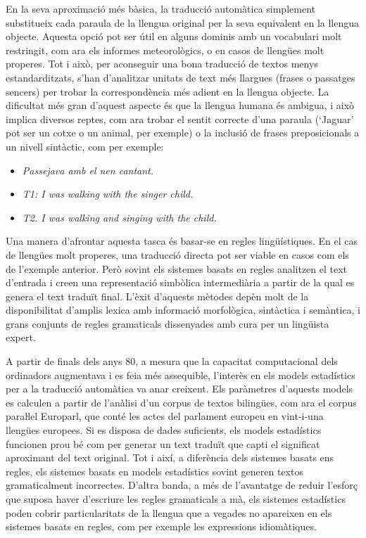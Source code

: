 \begin{multicols}{2}
En la seva aproximació més bàsica, la traducció automàtica simplement substitueix cada paraula de la llengua original per la seva equivalent en la llengua objecte. Aquesta opció pot ser útil en alguns dominis amb un vocabulari molt restringit, com ara els informes meteorològics, o en casos de llengües molt properes. Tot i això, per aconseguir una bona traducció de textos menys estandarditzats, s’han d’analitzar unitats de text més llargues (frases o passatges sencers) per trobar la correspondència més adient en la llengua objecte. La dificultat més gran d’aquest aspecte és que la llengua humana és ambigua, i això implica diversos reptes, com ara trobar el sentit correcte d’una paraula (‘Jaguar’ pot ser un cotxe o un animal, per exemple) o la inclusió de frases preposicionals a un nivell sintàctic, com per exemple:
\begin{itemize}
\item \textit{Passejava amb el nen cantant.}
\item \textit{T1: I was walking with the singer child.}
\item \textit{T2. I was walking and singing with the child.}
\end{itemize}

Una manera d’afrontar aquesta tasca és basar-se en regles lingüístiques. En el cas de llengües molt properes, una traducció directa pot ser viable en casos com els de l’exemple anterior. Però sovint els sistemes basats en regles analitzen el text d’entrada i creen una representació simbòlica intermediària a partir de la qual es genera el text traduït final. L’èxit d’aquests mètodes depèn molt de la disponibilitat d’amplis lexica amb informació morfològica, sintàctica i semàntica, i grans conjunts de regles gramaticals dissenyades amb cura per un lingüista expert.

A partir de finals dels anys 80, a mesura que la capacitat computacional dels ordinadors augmentava i es feia més assequible, l’interès en els models estadístics per a la traducció automàtica va anar creixent. Els paràmetres d’aquests models es calculen a partir de l’anàlisi d’un corpus de textos bilingües, com ara el corpus paraŀlel Europarl, que conté les actes del parlament europeu en vint-i-una llengües europees. Si es disposa de dades suficients, els models estadístics funcionen prou bé com per generar un text traduït que capti el significat aproximant del text original. Tot i així, a diferència dels sistemes basats ens regles, els sistemes basats en models estadístics sovint generen textos gramaticalment incorrectes. D’altra banda, a més de l’avantatge de reduir l’esforç que suposa haver d’escriure les regles gramaticals a mà, els sistemes estadístics poden cobrir particularitats de la llengua que a vegades no apareixen en els sistemes basats en regles, com per exemple les expressions idiomàtiques. 


\end{multicols}
